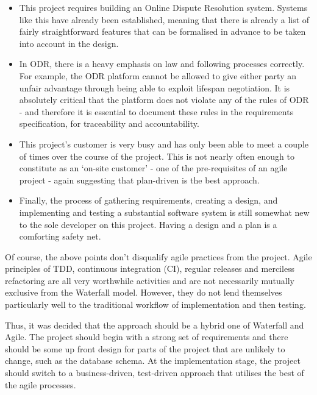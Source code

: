 \begin{itemize}

    \item This project requires building an Online Dispute Resolution system. Systems like this have already been established, meaning that there is already a list of fairly straightforward features that can be formalised in advance to be taken into account in the design.
    
    \item In ODR, there is a heavy emphasis on law and following processes correctly. For example, the ODR platform cannot be allowed to give either party an unfair advantage through being able to exploit lifespan negotiation. It is absolutely critical that the platform does not violate any of the rules of ODR - and therefore it is essential to document these rules in the requirements specification, for traceability and accountability.
    
    \item This project's customer is very busy and has only been able to meet a couple of times over the course of the project. This is not nearly often enough to constitute as an `on-site customer' - one of the pre-requisites of an agile project - again suggesting that plan-driven is the best approach.
    
    \item Finally, the process of gathering requirements, creating a design, and implementing and testing a substantial software system is still somewhat new to the sole developer on this project. Having a design and a plan is a comforting safety net.

\end{itemize}

Of course, the above points don't disqualify agile practices from the project. Agile principles of TDD, continuous integration (CI), regular releases and merciless refactoring are all very worthwhile activities and are not necessarily mutually exclusive from the Waterfall model. However, they do not lend themselves particularly well to the traditional workflow of implementation and then testing.

Thus, it was decided that the approach should be a hybrid one of Waterfall and Agile. The project should begin with a strong set of requirements and there should be some up front design for parts of the project that are unlikely to change, such as the database schema. At the implementation stage, the project should switch to a business-driven, test-driven approach that utilises the best of the agile processes.